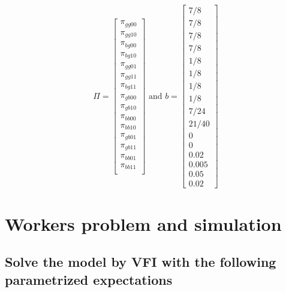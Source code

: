 \[ 
\Pi = \begin{bmatrix}
\pi_{gg00} \\ 
\pi_{gg10} \\ 
\pi_{bg00} \\ 
\pi_{bg10} \\ 
\pi_{gg01} \\ 
\pi_{gg11} \\ 
\pi_{bg11} \\ 
\pi_{gb00} \\ 
\pi_{gb10} \\ 
\pi_{bb00} \\ 
\pi_{bb10} \\
\pi_{gb01} \\
\pi_{gb11} \\
\pi_{bb01} \\ 
\pi_{bb11} \\    
\end{bmatrix}
\text{ and }
b = \begin{bmatrix}
7/8 \\
7/8 \\
7/8 \\
7/8 \\
1/8 \\
1/8 \\
1/8 \\
1/8 \\
7/24\\
21/40\\
0\\
0\\
0.02\\
0.005\\
0.05\\
0.02
\end{bmatrix}
\]


\pagebreak
\section{Workers problem and simulation}

\subsection{Solve the model by VFI with the following parametrized expectations}

